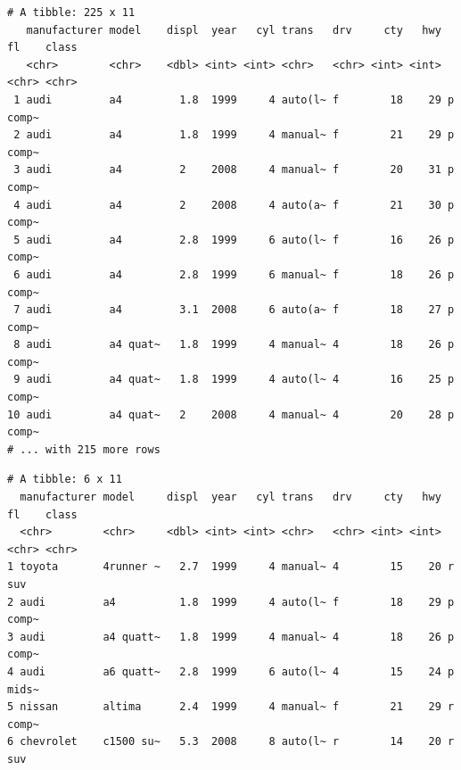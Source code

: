 \documentclass[
  11pt,
]{krantz}
\newenvironment{Shaded}{\begin{snugshade}}{\end{snugshade}}
\newcommand{\CommentTok}[1]{\textcolor[rgb]{0.37,0.37,0.37}{\textit{#1}}}
\newcommand{\DataTypeTok}[1]{\textcolor[rgb]{0.27,0.27,0.27}{#1}}
\newcommand{\DecValTok}[1]{\textcolor[rgb]{0.06,0.06,0.06}{#1}}
\newcommand{\KeywordTok}[1]{\textcolor[rgb]{0.27,0.27,0.27}{\textbf{#1}}}
\newcommand{\NormalTok}[1]{#1}
\newcommand{\OperatorTok}[1]{\textcolor[rgb]{0.43,0.43,0.43}{\textbf{#1}}}
\newcommand{\OtherTok}[1]{\textcolor[rgb]{0.37,0.37,0.37}{#1}}
\newcommand{\StringTok}[1]{\textcolor[rgb]{0.5,0.5,0.5}{#1}}
\begin{document}
\begin{verbatim}
# A tibble: 225 x 11
   manufacturer model    displ  year   cyl trans   drv     cty   hwy fl    class
   <chr>        <chr>    <dbl> <int> <int> <chr>   <chr> <int> <int> <chr> <chr>
 1 audi         a4         1.8  1999     4 auto(l~ f        18    29 p     comp~
 2 audi         a4         1.8  1999     4 manual~ f        21    29 p     comp~
 3 audi         a4         2    2008     4 manual~ f        20    31 p     comp~
 4 audi         a4         2    2008     4 auto(a~ f        21    30 p     comp~
 5 audi         a4         2.8  1999     6 auto(l~ f        16    26 p     comp~
 6 audi         a4         2.8  1999     6 manual~ f        18    26 p     comp~
 7 audi         a4         3.1  2008     6 auto(a~ f        18    27 p     comp~
 8 audi         a4 quat~   1.8  1999     4 manual~ 4        18    26 p     comp~
 9 audi         a4 quat~   1.8  1999     4 auto(l~ 4        16    25 p     comp~
10 audi         a4 quat~   2    2008     4 manual~ 4        20    28 p     comp~
# ... with 215 more rows
\end{verbatim}

\begin{Shaded}
\end{Shaded}

\begin{verbatim}
# A tibble: 6 x 11
  manufacturer model     displ  year   cyl trans   drv     cty   hwy fl    class
  <chr>        <chr>     <dbl> <int> <int> <chr>   <chr> <int> <int> <chr> <chr>
1 toyota       4runner ~   2.7  1999     4 manual~ 4        15    20 r     suv  
2 audi         a4          1.8  1999     4 auto(l~ f        18    29 p     comp~
3 audi         a4 quatt~   1.8  1999     4 manual~ 4        18    26 p     comp~
4 audi         a6 quatt~   2.8  1999     6 auto(l~ 4        15    24 p     mids~
5 nissan       altima      2.4  1999     4 manual~ f        21    29 r     comp~
6 chevrolet    c1500 su~   5.3  2008     8 auto(l~ r        14    20 r     suv  
\end{verbatim}
\end{document}
